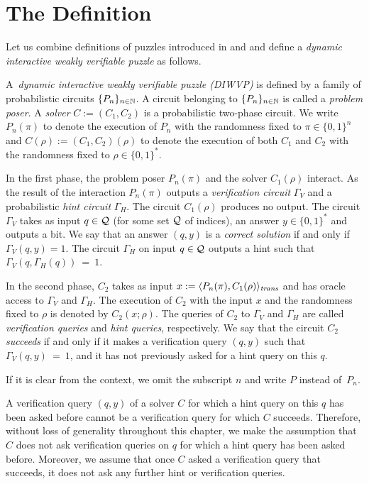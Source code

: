 \section{The Definition}
\label{section:wvp}
Let us combine definitions of puzzles introduced in \cite{dodis2009security} and \cite{holenstein2011general}
and define a \textit{dynamic interactive weakly verifiable puzzle} as follows.
\begin{definition}
  \label{def:dwvp}%
  A~\textit{dynamic interactive weakly verifiable puzzle (DIWVP)} is defined by a family of probabilistic circuits $\{P_n\}_{n \in \mathbb{N}}$.
  A circuit belonging to $\{P_n\}_{n \in \mathbb{N}}$ is called a \textit{problem poser}.
  A \textit{solver} $C := (C_1, C_2)$ is a probabilistic two-phase circuit.
  We write $P_n(\pi)$ to denote the execution of $P_n$ with the randomness fixed to $\pi \in \{0,1\}^n$ and $C(\rho) := (C_1,C_2)(\rho)$
  to denote the execution of both $C_1$ and $C_2$ with the randomness fixed to $\rho \in \{0,1\}^{*}$.

  In the first phase, the problem poser $P_n(\pi)$ and the solver $C_1(\rho)$ interact.
  As the result of the interaction $P_n(\pi)$ outputs a \textit{verification circuit} $\Gamma_{V}$ and a probabilistic \textit{hint circuit} $\Gamma_{H}$.
  The circuit $C_1(\rho)$ produces no output. The circuit $\Gamma_{V}$ takes as input $q \in \mathcal{Q}$ (for some set $\mathcal{Q}$ of indices),
  an answer $y \in \{0,1\}^*$ and outputs a bit. We say that an answer $(q,y)$ is a \textit{correct solution} if and only if $\Gamma_V(q,y) = 1$.
  The circuit $\Gamma_H$ on input $q \in \mathcal{Q}$ outputs a hint such that $\Gamma_V(q,\Gamma_H(q))~=~1$.

  In the second phase, $C_2$ takes as input $x := \langle P_n(\pi), C_1(\rho) \rangle_{\operatorname{\mathit{trans}}}$
  and has oracle access to $\Gamma_V$ and $\Gamma_H$.
  The execution of $C_2$ with the input $x$ and the randomness fixed to $\rho$
  is denoted by $C_2(x; \rho)$. The queries of $C_2$ to $\Gamma_V$ and $\Gamma_H$ are called \textit{verification queries} and \textit{hint queries}, respectively.
  We say that the circuit $C_2$ \textit{succeeds} if and only if it makes a verification query $(q,y)$ such that $\Gamma_V(q,y)~=~1$,
  and it has not previously asked for a hint query on this $q$.
\end{definition}

If it is clear from the context, we omit the subscript $n$ and write $P$ instead of~$P_n$.

A verification query $(q,y)$ of a solver $C$ for which a hint query on this $q$ has been asked before cannot be a verification query for which $C$ succeeds.
Therefore, without loss of generality throughout this chapter, we make the assumption that $C$ does not ask verification queries on $q$
for which a hint query has been asked before. Moreover, we assume that once $C$ asked a verification query that succeeds,
it does not ask any further hint or verification queries.

